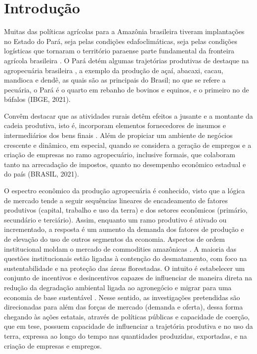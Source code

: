 
\section{Introdução}


Muitas das políticas agrícolas para a Amazônia brasileira tiveram implantações no Estado do Pará, seja pelas condições edafoclimáticas, seja pelas condições logísticas que tornaram o território paraense parte fundamental da fronteira agrícola brasileira \cite{maeda2009predicting}. O Pará detém algumas trajetórias produtivas de destaque na agropecuária brasileira \cite{pespectiva}, a exemplo da produção de açaí, abacaxi, cacau, mandioca e dendê, as quais são as principais do Brasil; no que se refere a pecuária, o Pará é o quarto em rebanho de bovinos e equinos, e o primeiro no de búfalos (IBGE, 2021).

Convêm destacar que as atividades rurais detêm efeitos a jusante e a montante da cadeia produtiva, isto é, incorporam elementos fornecedores de insumos e intermediários dos bens finais \cite{pinage2022forest}. Além de propiciar um ambiente de negócios crescente e dinâmico, em especial, quando se considera a geração de empregos e a criação de empresas no ramo agropecuário, inclusive formais, que colaboram tanto na arrecadação de impostos, quanto no desempenho econômico estadual e do país (BRASIL, 2021).

O espectro econômico da produção agropecuária é conhecido, visto que a lógica de mercado tende a seguir sequências lineares de encadeamento de fatores produtivos (capital, trabalho e uso da terra) e dos setores econômicos (primário, secundário e terciário). Assim, enquanto um ramo produtivo é ativado ou incrementado, a resposta é um aumento da demanda dos fatores de produção e de elevação do uso de outros segmentos da economia. Aspectos de ordem institucional moldam o mercado de commodities amazônicas \cite{bolch2020remote}. A maioria das questões institucionais estão ligadas à contenção do desmatamento, com foco na sustentabilidade e na proteção das áreas florestadas. O intuito é estabelecer um conjunto de incentivos e desincentivos capazes de influenciar de maneira direta na redução da degradação ambiental ligada ao agronegócio e migrar para uma economia de base sustentável \cite{zambon2019revolutionizing}. Nesse sentido, as investigações pretendidas são direcionadas para além das forças de mercado (demanda e oferta), dessa forma chegando às ações estatais, através de políticas públicas e capacidade de coerção, que em tese, possuem capacidade de influenciar a trajetória produtiva e no uso da terra, expressa ao longo do tempo nas quantidades produzidas, exportadas, e na criação de empresas e empregos.

